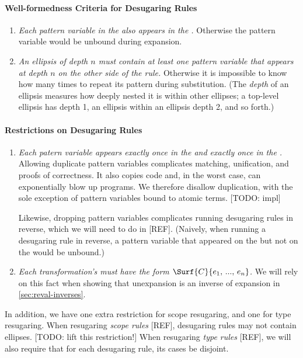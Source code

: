 \paragraph{Well-formedness Criteria for Desugaring Rules}
\begin{enumerate}
\item \emph{Each pattern variable in the  also appears in the
  .} Otherwise the pattern variable would be unbound during
  expansion.
\item \emph{An ellipsis of depth $n$ must contain at least one pattern
  variable that appears at depth $n$ on the other side of the rule.}
  Otherwise it is impossible to know how many times to repeat its
  pattern during substitution. (The \emph{depth} of an ellipsis
  measures how deeply nested it is within other ellipses; a top-level
  ellipsis has depth 1, an ellipsis within an ellipsis depth 2, and so
  forth.)
\end{enumerate}

\paragraph{Restrictions on Desugaring Rules}
\begin{enumerate}
\item \emph{Each patern variable appears exactly once in the 
  and exactly once in the .}
  Allowing duplicate pattern variables complicates matching,
  unification, and proofs of correctness. It also copies code and, in
  the worst case, can exponentially blow up programs.  We therefore
  disallow duplication, with the sole exception of pattern variables
  bound to atomic terms. [TODO: impl]
  
  Likewise, dropping pattern variables complicates running desugaring
  rules in reverse, which we will need to do in [REF]. (Naively, when
  running a desugaring rule in reverse, a pattern variable that
  appeared on the  but not on the  would be unbound.)
\item \emph{Each transformation's  must have the form
  $\Surf{C}{e_1,\,...,\,e_n}$.} We will rely on this fact when showing that
  unexpansion is an inverse of expansion in \cref{sec:reval-inverses}.
\end{enumerate}

In addition, we have one extra restriction for scope resugaring, and
one for type resugaring.
When resugaring \emph{scope rules} [REF], desugaring rules may not
contain ellipses. [TODO: lift this restriction!]
When resugaring \emph{type rules} [REF], we will also
require that for each desugaring rule, its cases be disjoint.


